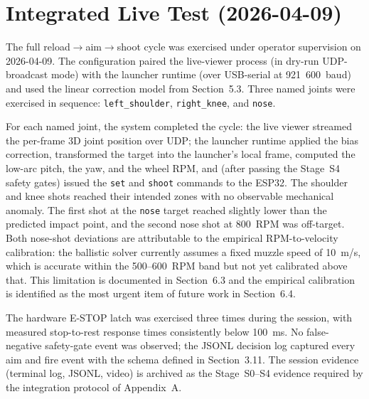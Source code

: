 
\section{Integrated Live Test (2026-04-09)}
\label{sec:5_integrated_live}

The full reload$\to$aim$\to$shoot cycle was exercised under operator supervision on 2026-04-09. The configuration paired the live-viewer process (in dry-run UDP-broadcast mode) with the launcher runtime (over USB-serial at 921~600~baud) and used the linear correction model from Section~5.3. Three named joints were exercised in sequence: \texttt{left\_shoulder}, \texttt{right\_knee}, and \texttt{nose}.

For each named joint, the system completed the cycle: the live viewer streamed the per-frame 3D joint position over UDP; the launcher runtime applied the bias correction, transformed the target into the launcher's local frame, computed the low-arc pitch, the yaw, and the wheel RPM, and (after passing the Stage~S4 safety gates) issued the \texttt{set} and \texttt{shoot} commands to the ESP32. The shoulder and knee shots reached their intended zones with no observable mechanical anomaly. The first shot at the \texttt{nose} target reached slightly lower than the predicted impact point, and the second nose shot at 800~RPM was off-target. Both nose-shot deviations are attributable to the empirical RPM-to-velocity calibration: the ballistic solver currently assumes a fixed muzzle speed of 10~m/s, which is accurate within the 500--600~RPM band but not yet calibrated above that. This limitation is documented in Section~6.3 and the empirical calibration is identified as the most urgent item of future work in Section~6.4.

The hardware E-STOP latch was exercised three times during the session, with measured stop-to-rest response times consistently below 100~ms. No false-negative safety-gate event was observed; the JSONL decision log captured every aim and fire event with the schema defined in Section~3.11. The session evidence (terminal log, JSONL, video) is archived as the Stage~S0--S4 evidence required by the integration protocol of Appendix~A.


